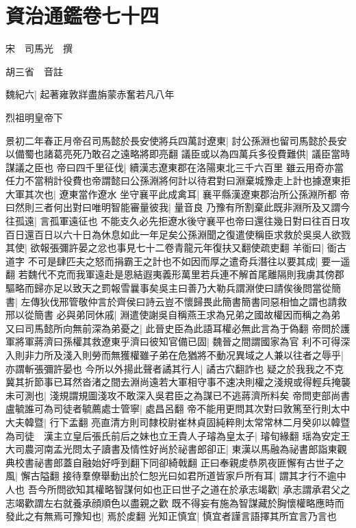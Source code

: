 \section{資治通鑑卷七十四}
宋　司馬光　撰

胡三省　音註

魏紀六|{
	起著雍敦牂盡旃蒙赤奮若凡八年}


烈祖明皇帝下

景初二年春正月帝召司馬懿於長安使將兵四萬討遼東|{
	討公孫淵也留司馬懿於長安以備蜀也諸葛亮死乃敢召之遠略將即亮翻}
議臣或以為四萬兵多役費難供|{
	議臣當時謀議之臣也}
帝曰四千里征伐|{
	續漢志遼東郡在洛陽東北三千六百里}
雖云用奇亦當任力不當稍計役費也帝謂懿曰公孫淵將何計以待君對曰淵棄城豫走上計也據遼東拒大軍其次也|{
	遼東當作遼水}
坐守襄平此成禽耳|{
	襄平縣漢遼東郡治所公孫淵所都}
帝曰然則三者何出對曰唯明智能審量彼我|{
	量音良}
乃豫有所割棄此既非淵所及又謂今往孤遠|{
	言孤軍遠征也}
不能支久必先拒遼水後守襄平也帝曰還往幾日對曰往百日攻百日還百日以六十日為休息如此一年足矣公孫淵聞之復遣使稱臣求救於吳吳人欲戮其使|{
	欲報張彌許晏之忿也事見七十二卷青龍元年復扶又翻使疏吏翻}
羊衜曰|{
	衜古道字}
不可是肆匹夫之怒而捐霸王之計也不如因而厚之遣奇兵潛往以要其成|{
	要一遥翻}
若魏代不克而我軍遠赴是恩結遐夷義形萬里若兵連不解首尾離隔則我虜其傍郡驅略而歸亦足以致天之罰報雪曩事矣吳主曰善乃大勒兵謂淵使曰請俟後問當從簡書|{
	左傳狄伐邢管敬仲言於齊侯曰詩云豈不懷歸畏此簡書簡書同惡相恤之謂也請救邢以從簡書}
必與弟同休戚|{
	淵遣使謝吳自稱燕王求為兄弟之國故權因而稱之為弟}
又曰司馬懿所向無前深為弟憂之|{
	此晉史臣為此語耳權必無此言為于偽翻}
帝問於護軍將軍蔣濟曰孫權其救遼東乎濟曰彼知官備已固|{
	魏晉之間謂國家為官}
利不可得深入則非力所及淺入則勞而無獲權雖子弟在危猶將不動况異域之人兼以往者之辱乎|{
	亦謂斬張彌許晏也}
今所以外揚此聲者譎其行人|{
	譎古穴翻詐也}
疑之於我我之不克冀其折節事已耳然沓渚之間去淵尚遠若大軍相守事不速决則權之淺規或得輕兵掩襲未可測也|{
	淺規謂規圖淺攻不敢深入吳君臣之為謀已不逃蔣濟所料矣}
帝問吏部尚書盧毓誰可為司徒者毓薦處士管寧|{
	處昌呂翻}
帝不能用更問其次對曰敦篤至行則太中大夫韓暨|{
	行下孟翻}
亮直清方則司隸校尉崔林貞固純粹則太常常林二月癸卯以韓暨為司徒　漢主立皇后張氏前后之妹也立王貴人子璿為皇太子|{
	璿旬緣翻}
瑶為安定王大司農河南孟光問太子讀書及情性好尚於祕書郎卻正|{
	東漢以馬融為祕書郎詣東觀典校書祕書郎蓋自融始好呼到翻下同卻綺戟翻}
正曰奉親䖍恭夙夜匪懈有古世子之風|{
	懈古隘翻}
接待羣僚舉動出於仁恕光曰如君所道皆家戶所有耳|{
	謂其才行不逾中人也}
吾今所問欲知其權略智謀何如也正曰世子之道在於承志竭歡|{
	承志謂承君父之志竭歡謂左右就養承顔順色以盡親之歡}
既不得妄有施為智謀藏於胸懷權略應時而發此之有無焉可豫知也|{
	焉於䖍翻}
光知正慎宜|{
	慎宜者謹言語擇其所宜言乃言也}
